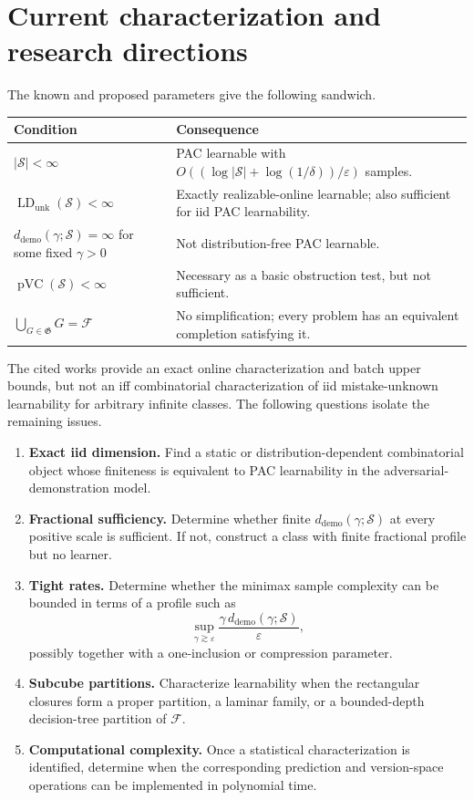 \documentclass[11pt]{article}
\theoremstyle{definition}
\theoremstyle{remark}
\newcommand{\F}{\mathcal F}
\newcommand{\Outer}{\mathfrak G}
\newcommand{\SV}{\mathcal S}
\newcommand{\eps}{\varepsilon}
\newcommand{\LDu}{\operatorname{LD}_{\mathrm{unk}}}
\newcommand{\pVC}{\operatorname{pVC}}
\newcommand{\ddemo}{d_{\mathrm{demo}}}
\newcommand{\1}{\mathbf 1}
\begin{document}
\section{Current characterization and research directions}

The known and proposed parameters give the following sandwich.

\begin{center}
\begin{tabularx}{0.96\textwidth}{>{\raggedright\arraybackslash}p{} X}
\toprule
Condition & Consequence \\
\midrule
$|\SV|<\infty$ & PAC learnable with $O((\log|\SV|+\log(1/\delta))/\eps)$ samples. \\
$\LDu(\SV)<\infty$ & Exactly realizable-online learnable; also sufficient for iid PAC learnability. \\
$\ddemo(\gamma;\SV)=\infty$ for some fixed $\gamma>0$ & Not distribution-free PAC learnable. \\
$\pVC(\SV)<\infty$ & Necessary as a basic obstruction test, but not sufficient. \\
$\bigcup_{G\in\Outer}G=\F$ & No simplification; every problem has an equivalent completion satisfying it. \\
\bottomrule
\end{tabularx}
\end{center}

The cited works provide an exact online characterization and batch upper bounds, but not an iff combinatorial characterization of iid mistake-unknown learnability for arbitrary infinite classes. The following questions isolate the remaining issues.

\begin{enumerate}
    \item \textbf{Exact iid dimension.} Find a static or distribution-dependent combinatorial object whose finiteness is equivalent to PAC learnability in the adversarial-demonstration model.

    \item \textbf{Fractional sufficiency.} Determine whether finite $\ddemo(\gamma;\SV)$ at every positive scale is sufficient. If not, construct a class with finite fractional profile but no learner.

    \item \textbf{Tight rates.} Determine whether the minimax sample complexity can be bounded in terms of a profile such as
    \[
        \sup_{\gamma\gtrsim\eps}
        \frac{\gamma\,\ddemo(\gamma;\SV)}{\eps},
    \]
    possibly together with a one-inclusion or compression parameter.

    \item \textbf{Subcube partitions.} Characterize learnability when the rectangular closures form a proper partition, a laminar family, or a bounded-depth decision-tree partition of $\F$.

    \item \textbf{Computational complexity.} Once a statistical characterization is identified, determine when the corresponding prediction and version-space operations can be implemented in polynomial time.
\end{enumerate}
\end{document}
